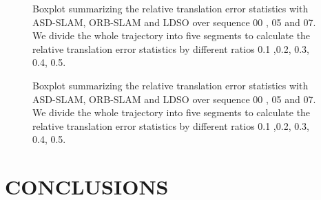 \documentclass[letterpaper, 10 pt, conference]{ieeeconf}  %
\begin{document}
\begin{figure}[H]
\flushleft 
{}%
%

%
%

\caption{Boxplot summarizing the relative translation error statistics with ASD-SLAM, ORB-SLAM and LDSO over sequence 00 , 05 and 07. We divide the whole trajectory into five segments to  calculate the relative translation error statistics by different ratios 0.1 ,0.2, 0.3, 0.4, 0.5. } 
\end{figure}
\begin{figure}[H]
\centering
{}%

%
\caption{Boxplot summarizing the relative translation error statistics with ASD-SLAM, ORB-SLAM and LDSO over sequence 00 , 05 and 07. We divide the whole trajectory into five segments to  calculate the relative translation error statistics by different ratios 0.1 ,0.2, 0.3, 0.4, 0.5. } 
\end{figure}



\section{CONCLUSIONS}
\end{document}
